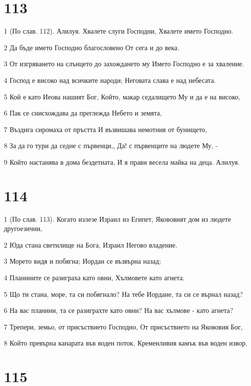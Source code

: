 \chapter{113}

\par 1 (По слав. 112). Алилуя. Хвалете слуги Господни, Хвалете името Господно.
\par 2 Да бъде името Господно благословено От сега и до века.
\par 3 От изгряването на слънцето до захождането му Името Господно е за хваление.
\par 4 Господ е високо над всичките народи; Неговата слава е над небесата.
\par 5 Кой е като Иеова нашият Бог, Който, макар седалището Му и да е на високо,
\par 6 Пак се снисхождава да преглежда Небето и земята,
\par 7 Въздига сиромаха от пръстта И възвишава немотния от бунището,
\par 8 За да го тури да седне с първенци,, Да! с първенците на людете Му, -
\par 9 Който настанява в дома бездетната, И я прави весела майка на деца. Алилуя.

\chapter{114}

\par 1 (По слав. 113). Когато излезе Израил из Египет, Якововият дом из людете другоезични,
\par 2 Юда стана светилище на Бога, Израил Негово владение.
\par 3 Морето видя и побягна; Иордан се възвърна назад;
\par 4 Планините се разиграха като овни, Хълмовете като агнета.
\par 5 Що ти стана, море, та си побягнало? На тебе Иордане, та си се върнал назад?
\par 6 На вас планини, та се разиграхте като овни? На вас хълмове - като агнета?
\par 7 Трепери, земьо, от присъствието Господно, От присъствието на Якововия Бог,
\par 8 Който превърна канарата във воден поток, Кременливия камък във воден извор.

\chapter{115}

